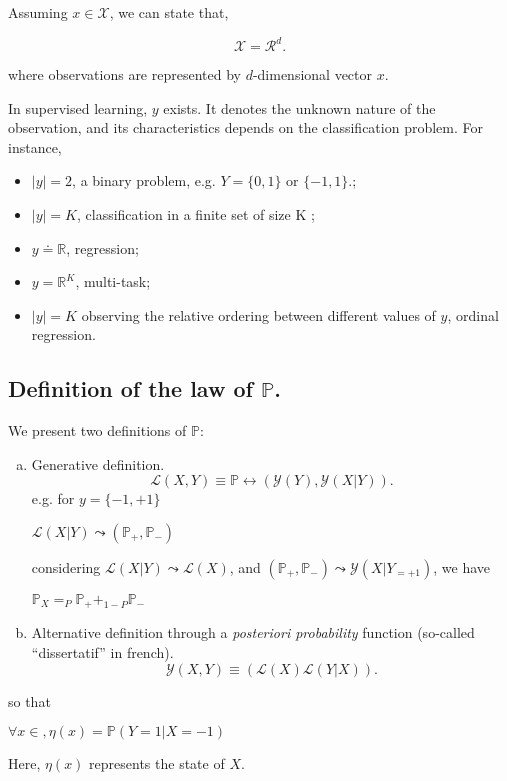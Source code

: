 		Assuming $x \in \mathcal{X}$, we can state that,

		\begin{equation}
			\mathcal{X} = \mathcal{R}^d.
			\label{x_example}
		\end{equation}

		where observations are represented by $d$-dimensional vector $x$. 

		In supervised learning, $y$ exists. It denotes the unknown nature of the observation, 
		and its characteristics depends on the classification problem. For instance,

		\begin{itemize}
			\item $|y|=2$, a binary problem, e.g. $Y = \{0,1\} \mbox{ or } \{-1,1\}.$;
			\item $|y|=K$, classification in a finite set of size K ;
			\item $y \doteq \mathbb{R}$, regression;
			\item $y = \mathbb{R}^K$, multi-task;
			\item $|y| = K$ observing the relative ordering between different values of $y$, ordinal regression.
		\end{itemize}
		
		\subsection{Definition of the law of $\mathbb{P}$.}

			We present two definitions of $\mathbb{P}$:

			\begin{enumerate}[a)] %
				\item Generative definition.
					\begin{equation}
						\mathcal{L}(X,Y) \equiv \mathbb{P} \leftrightarrow (\mathcal{Y}(Y), \mathcal{Y}(X|Y)).
						\label{p_generative_law_example}
					\end{equation}
				e.g. for $y=\{-1,+1\}$\\ 
				\centerline{$\mathcal{L}(X|Y) \leadsto (\mathbb{P}_{+},\mathbb{P}_{-})$}

				considering $\mathcal{L}(X|Y) \leadsto \mathcal{L}(X)$, and $(\mathbb{P}_{+},\mathbb{P}_{-}) \leadsto \mathcal{Y}(X|Y_{=+1})$, we have\\ 
				\centerline{$\mathbb{P}_X = _{P}\mathbb{P}_{+} + _{1-P}\mathbb{P}_{-}$}


				\item Alternative definition through a \emph{posteriori probability} function \cite{tc_Lugosi} (so-called ``dissertatif'' in french).
					\begin{equation}
						\mathcal{Y}(X,Y) \equiv (\mathcal{L}(X)\mathcal{L}(Y|X)).
						\label{p_generative_law_example}
					\end{equation}
			\end{enumerate}
			so that\\
			\centerline{$\forall x \in, \eta(x)=\mathbb{P}(Y=1|X=-1)$}
			Here, $\eta(x)$ represents the state of $X$.
		



